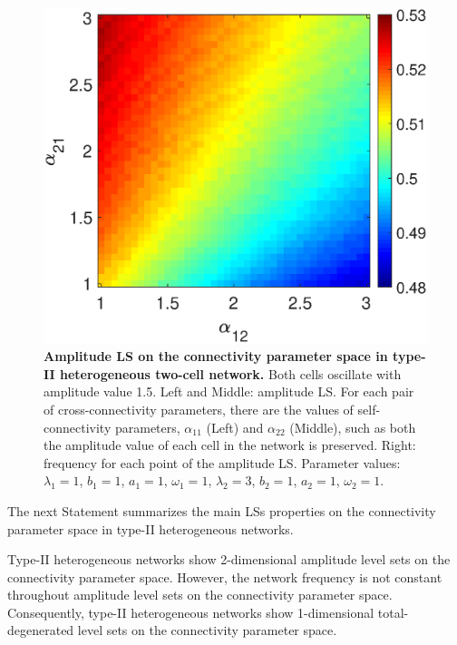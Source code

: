 \begin{figure}[h]
\begin{minipage}{0.32\linewidth}
  \end{minipage} 
   \begin{minipage}{0.32\linewidth}
  \begin{center}
\includegraphics[width=1\linewidth]{Images/photo25_3.eps}
\end{center}

  \end{minipage} 
  
  \caption{\textbf{Amplitude LS on the connectivity parameter space in type-\textrm{II} heterogeneous two-cell network.} Both cells oscillate with amplitude value 1.5. Left and Middle: amplitude LS. For each pair of cross-connectivity parameters, there are the values of self-connectivity parameters, $\alpha_{11}$ (Left) and $\alpha_{22}$ (Middle), such as both the amplitude value of each cell in the network is preserved. Right: frequency for each point of the amplitude LS. Parameter values: $\lambda_{1} = 1$, $b_{1}=1$, $a_{1} = 1$, $\omega_{1} = 1$, $\lambda_{2} = 3$, $b_{2}=1$, $a_{2} = 1$, $\omega_{2} = 1$.}
  \label{photo25}
\end{figure}

The next Statement summarizes the main LSs properties on the connectivity parameter space in type-\textrm{II} heterogeneous networks.

\begin{Statement}
Type-\textrm{II} heterogeneous networks show 2-dimensional amplitude level sets on the connectivity parameter space. However, the network frequency is not constant throughout amplitude level sets on the connectivity parameter space. Consequently, type-\textrm{II} heterogeneous networks show 1-dimensional total-degenerated level sets on the connectivity parameter space.
\end{Statement}


